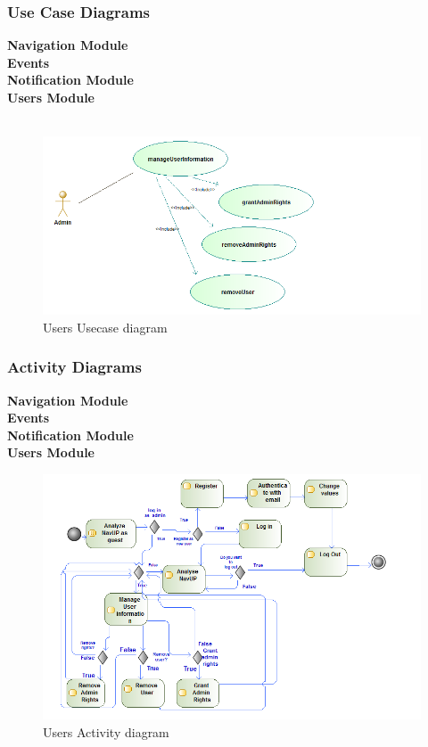 \documentclass[a4paper,12pt]{report}
\begin{document}
	\subsubsection{Use Case Diagrams}
	\textbf{Navigation Module}\\
	\textbf{Events}\\
	\textbf{Notification Module}\\
	\textbf{Users Module}\\\\
	\begin{figure}[h!]
		\includegraphics[width=\linewidth]{usecase.png}
		\caption{Users Usecase diagram}
		\label{fig:Users Usecase diagram}
	\end{figure}
		\subsubsection{Activity Diagrams}
	\textbf{Navigation Module}\\
	\textbf{Events}\\
	\textbf{Notification Module}\\
	\textbf{Users Module}\\
	\begin{figure}[h!]
		\includegraphics[width=\linewidth]{activitty.png}
		\caption{Users Activity diagram}
		\label{fig:Users Activity diagram}
	\end{figure}
	
\end{document}
